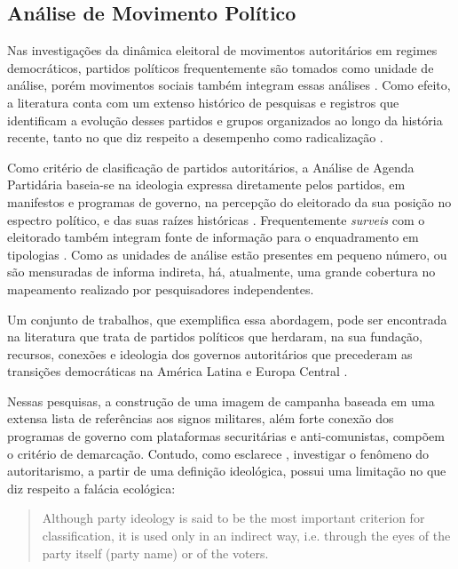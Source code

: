 \documentclass[
12pt,				%
openright,			%
twoside,			%
a4paper,			%
english,			%
french,				%
spanish,			%
brazil				%
]{abntex2}
\begin{document}
\subsection{Análise de Movimento Político}

Nas investigações da dinâmica eleitoral de movimentos autoritários em regimes democráticos, partidos políticos frequentemente são tomados como unidade de análise, porém movimentos sociais também integram essas análises \cite{caiani2017radical}. Como efeito, a literatura conta com um extenso histórico de pesquisas e registros que identificam a evolução desses partidos e grupos organizados ao longo da história recente, tanto no que diz respeito a desempenho como radicalização \cite{norris2005radical, mudde2009populist, caiani2017radical, mudde2016introduction, mudde2017ideational}. 

Como critério de clasificação de partidos autoritários, a Análise de Agenda Partidária baseia-se na ideologia expressa diretamente pelos partidos, em manifestos e programas de governo, na percepção do eleitorado da sua posição no espectro político, e das suas raízes históricas \cite{mudde2000ideology}. Frequentemente \emph{surveis} com o eleitorado também integram fonte de informação para o enquadramento em tipologias \cite{booth1984political, booth1994paths, macwilliams2016decides}. Como as unidades de análise estão presentes em pequeno número, ou são mensuradas de informa indireta, há, atualmente, uma grande cobertura no mapeamento realizado por pesquisadores independentes.

Um conjunto de trabalhos, que exemplifica essa abordagem, pode ser encontrada na literatura que trata de partidos políticos que herdaram, na sua fundação, recursos, conexões e ideologia dos governos autoritários que precederam as transições democráticas na América Latina \cite{loxton2015authoritarian, loxton2014authoritarian, lyons2016victorious, loxton2015authoritarian} e Europa Central \cite{grzymala2006authoritarian}. 

Nessas pesquisas, a construção de uma imagem de campanha baseada em uma extensa lista de referências aos signos militares, além forte conexão dos programas de governo com plataformas securitárias e anti-comunistas, compõem o critério de demarcação. Contudo, como esclarece , investigar o fenômeno do autoritarismo, a partir de uma definição ideológica, possui uma limitação no que diz respeito a falácia ecológica:

\begin{samepage}
	\begin{quote}
		Although party ideology is said to be the most important criterion for classification, it is used only in an indirect way, i.e. through the eyes of the party itself (party name) or of the voters. \cite{mudde2000ideology}
	\end{quote}
\end{samepage}
\end{document}
